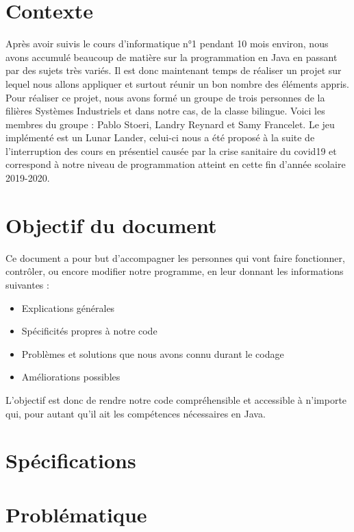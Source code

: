 \section{Contexte}
Après avoir suivis le cours d’informatique n°1 pendant 10 mois environ, nous avons accumulé beaucoup de matière sur la programmation en Java en passant par des sujets très variés. Il est donc maintenant temps de réaliser un projet sur lequel nous allons appliquer et surtout réunir un bon nombre des éléments appris.
Pour réaliser ce projet, nous avons formé un groupe de trois personnes de la filières Systèmes Industriels et dans notre cas, de la classe bilingue. Voici les membres du groupe : Pablo Stoeri, Landry Reynard et Samy Francelet.
Le jeu implémenté est un Lunar Lander, celui-ci nous a été proposé à la suite de l’interruption des cours en présentiel causée par la crise sanitaire du covid19 et correspond à notre niveau de programmation atteint en cette fin d’année scolaire 2019-2020.

\section{Objectif du document}
Ce document a pour but d’accompagner les personnes qui vont faire fonctionner, contrôler, ou encore modifier notre programme, en leur donnant les informations suivantes :
\begin{itemize}
\item	Explications générales
\item	Spécificités propres à notre code
\item	Problèmes et solutions que nous avons connu durant le codage
\item	Améliorations possibles
\end{itemize}
L’objectif est donc de rendre notre code compréhensible et accessible à n’importe qui, pour autant qu’il ait les compétences nécessaires en Java.


\section{Spécifications}

\section{Problématique}
